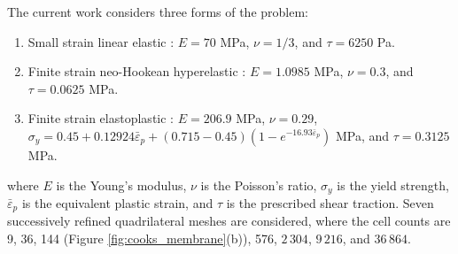 \documentclass[sn-mathphys,Numbered]{sn-jnl}%
\begin{document}
The current work considers three forms of the problem:
\begin{enumerate}[label=\roman*.]
	\item Small strain linear elastic \cite{Zienkiewicz2000, Simplas}: $E=70$ MPa, $\nu=1/3$, and $\tau = 6250$ Pa.
	\item Finite strain neo-Hookean hyperelastic \cite{Pelteret2018}: $E=1.0985$ MPa, $\nu=0.3$, and $\tau = 0.0625$ MPa.
	\item Finite strain elastoplastic \citep{Simo1992, Simplas}: $E=206.9$ MPa, $\nu=0.29$, $\sigma_y = 0.45 + 0.12924\bar{\varepsilon}_p + (0.715 - 0.45)(1- e^{-16.93\bar{\varepsilon}_p})$ MPa, and $\tau = 0.3125$ MPa.
\end{enumerate}
where $E$ is the Young's modulus, $\nu$ is the Poisson's ratio, $\sigma_y$ is the yield strength, $\bar{\varepsilon}_p$ is the equivalent plastic strain, and $\tau$ is the prescribed shear traction.
Seven successively refined quadrilateral meshes are considered, where the cell counts are 9, 36, 144 (Figure \ref{fig:cooks_membrane}(b)), 576, $2\,304$, $9\,216$, and $36\,864$.
\end{document}
